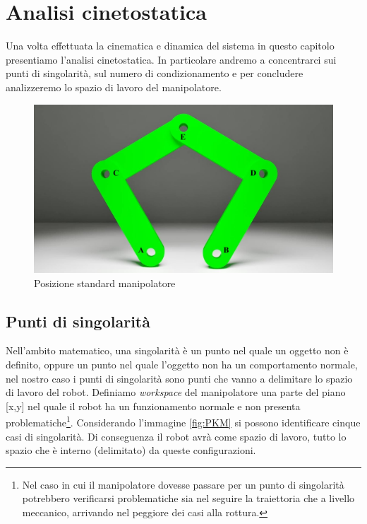\section{Analisi cinetostatica}
Una volta effettuata la cinematica e dinamica del sistema in questo capitolo presentiamo l'analisi cinetostatica. In particolare andremo a concentrarci sui punti di singolarità, sul numero di condizionamento e per concludere analizzeremo lo spazio di lavoro del manipolatore.
\begin{figure}[ht]
	\begin{center}
		\includegraphics[scale=0.3]{Immagini/Singolarity/0}
		\caption{Posizione standard manipolatore}
	\end{center}
\end{figure}
\subsection{Punti di singolarità}
Nell'ambito matematico, una singolarità è un punto nel quale un oggetto non è definito, oppure un punto nel quale l'oggetto non ha un comportamento normale, nel nostro caso i punti di singolarità sono punti che vanno a delimitare lo spazio di lavoro del robot. Definiamo \textit{workspace} del manipolatore una parte del piano [x,y] nel quale il robot ha un funzionamento normale e non presenta problematiche\footnote{Nel caso in cui il manipolatore dovesse passare per un punto di singolarità potrebbero verificarsi problematiche sia nel seguire la traiettoria che a livello meccanico, arrivando nel peggiore dei casi alla rottura.}. Considerando l'immagine \ref{fig:PKM} si possono identificare cinque casi di singolarità. Di conseguenza il robot avrà come spazio di lavoro, tutto lo spazio che è interno (delimitato) da queste configurazioni.
